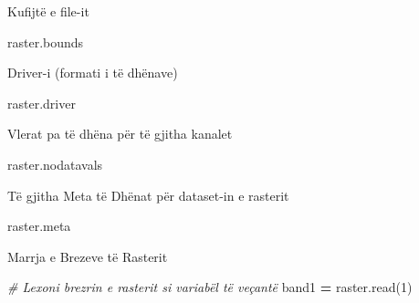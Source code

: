\documentclass[
  ignorenonframetext,
]{beamer}
\newenvironment{Shaded}{\begin{snugshade}}{\end{snugshade}}
\newcommand{\CommentTok}[1]{\textcolor[rgb]{0.56,0.35,0.01}{\textit{#1}}}
\newcommand{\DecValTok}[1]{\textcolor[rgb]{0.00,0.00,0.81}{#1}}
\newcommand{\NormalTok}[1]{#1}
\newcommand{\OperatorTok}[1]{\textcolor[rgb]{0.81,0.36,0.00}{\textbf{#1}}}
\begin{document}
\begin{frame}[fragile]{Kufijtë e file-it}
\protect\hypertarget{kufijtuxeb-e-file-it}{}

\begin{Shaded}
\begin{Highlighting}[]
\NormalTok{raster.bounds}
\end{Highlighting}
\end{Shaded}
\end{frame}

\begin{frame}[fragile]{Driver-i (formati i të dhënave)}
\protect\hypertarget{driver-i-formati-i-tuxeb-dhuxebnave}{}

\begin{Shaded}
\begin{Highlighting}[]
\NormalTok{raster.driver}
\end{Highlighting}
\end{Shaded}
\end{frame}

\begin{frame}[fragile]{Vlerat pa të dhëna për të gjitha kanalet}
\protect\hypertarget{vlerat-pa-tuxeb-dhuxebna-puxebr-tuxeb-gjitha-kanalet}{}

\begin{Shaded}
\begin{Highlighting}[]
\NormalTok{raster.nodatavals}
\end{Highlighting}
\end{Shaded}
\end{frame}

\begin{frame}[fragile]{Të gjitha Meta të Dhënat për dataset-in e
rasterit}
\protect\hypertarget{tuxeb-gjitha-meta-tuxeb-dhuxebnat-puxebr-dataset-in-e-rasterit}{}

\begin{Shaded}
\begin{Highlighting}[]
\NormalTok{raster.meta}
\end{Highlighting}
\end{Shaded}
\end{frame}

\begin{frame}[fragile]{Marrja e Brezeve të Rasterit}
\protect\hypertarget{marrja-e-brezeve-tuxeb-rasterit}{}

\begin{Shaded}
\begin{Highlighting}[]
\CommentTok{\# Lexoni brezrin e rasterit si variabël të veçantë}
\NormalTok{band1 }\OperatorTok{=}\NormalTok{ raster.read(}\DecValTok{1}\NormalTok{)}
\end{Highlighting}
\end{Shaded}
\end{frame}
\end{document}
